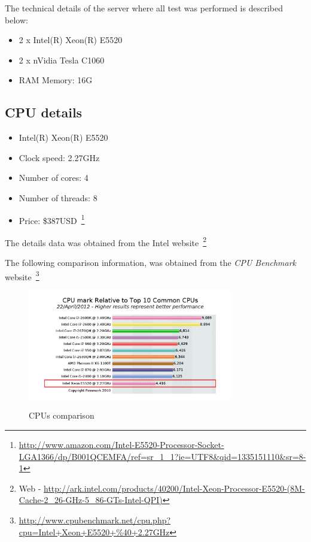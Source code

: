 The technical details of the server where all
test was performed is described below:


\begin{itemize}
    \item 2 x Intel(R) Xeon(R) E5520
    \item 2 x nVidia Tesla C1060
    \item RAM Memory: 16G
\end{itemize}

\subsection{CPU details}
\begin{itemize}
    \item Intel(R) Xeon(R) E5520
    \item Clock speed: 2.27GHz
    \item Number of cores: 4
    \item Number of threads: 8
    \item Price: \$387USD~\footnote{\url{http://www.amazon.com/Intel-E5520-Processor-Socket-LGA1366/dp/B001QCEMFA/ref=sr\_1\_1?ie=UTF8&qid=1335151110&sr=8-1}}
\end{itemize}

The details data was obtained from the Intel website~\footnote{
Web - \url{http://ark.intel.com/products/40200/Intel-Xeon-Processor-E5520-(8M-Cache-2\_26-GHz-5\_86-GTs-Intel-QPI)}}

The following comparison information,
was obtained from the \emph{CPU Benchmark} website~\footnote{
\url{http://www.cpubenchmark.net/cpu.php?cpu=Intel+Xeon+E5520+\%40+2.27GHz}}

\begin{figure}[h!]
    \centering
    \includegraphics[width=0.8\textwidth]{img/cpu-cpu-ranking.png}
    \label{fig:cpu1}
    \caption{CPUs comparison}
\end{figure}

